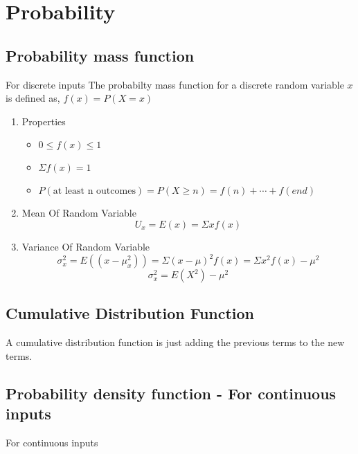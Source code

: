 \documentclass[11pt]{report}
\begin{document}
\chapter{Probability}
\label{sec:org9106373}
\section{Probability mass function}
\label{sec:orged2ca35}
For discrete inputs
The probabilty mass function for a discrete random variable \(x\) is defined as, \(f(x) = P(X = x)\)
\begin{enumerate}
\item Properties
\label{sec:org725116e}
\begin{itemize}
\item \(0 \leq f(x) \leq 1\)
\item \(\Sigma f(x) = 1\)
\item \(P(\text{at least n outcomes}) = P(X \geq n) = f(n) + \cdots + f(end)\)
\end{itemize}
\item Mean Of Random Variable
\label{sec:org1aa6de4}
$$U_x = E(x) = \Sigma x f(x)$$
\item Variance Of Random Variable
\label{sec:org5c38c06}
$$\sigma_x^{2} = E((x-\mu_{x}^2)) = \Sigma (x-\mu)^2 f(x) = \Sigma x^2f(x) - \mu^{2}$$
$$\sigma_x^{2} = E(X^2) - \mu^2$$
\end{enumerate}
\section{Cumulative Distribution Function}
\label{sec:orge96c50b}
A cumulative distribution function is just adding the previous terms to the new terms.
\section{Probability density function - For continuous inputs}
\label{sec:orgbee7876}
For continuous inputs
\end{document}
